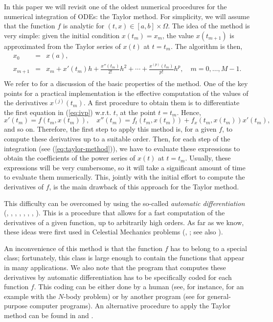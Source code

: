 \documentclass[12pt,twoside]{article}
\begin{document}
In this paper we will revisit one of the oldest numerical procedures
for the numerical integration of ODEs: the Taylor method. For
simplicity, we will assume that the function $f$ is analytic for
$(t,x)\in[a,b]\times\Omega$. The idea of the method is very simple:
given the initial condition $x(t_m)=x_m$, the value $x(t_{m+1})$ is
approximated from the Taylor series of $x(t)$ at $t=t_m$. The
algorithm is then,
\begin{equation}
\begin{array}{rcl}
x_0 &=&x(a), \\
x_{m+1} &=& x_m+x'(t_m)h+\displaystyle\frac{x''(t_m)}{2!}h^2+\cdots+
   \displaystyle\frac{x^{(p)}(t_m)}{p!}h^p,
      \quad m=0,\ldots, M-1. \\
\end{array}
\label{eq:taylor-method}
\end{equation}
We refer to \cite{HairerNW00} for a discussion of the basic properties
of the method. One of the key points for a practical implementation is
the effective computation of the values of the derivatives
$x^{(j)}(t_m)$. A first procedure to obtain them is to differentiate
the first equation in (\ref{eq:ivp}) w.r.t. $t$, at the point
$t=t_m$. Hence,
\[
x'(t_m)=f(t_m,x(t_m)),\quad
x''(t_m)=f_t(t_m,x(t_m))+f_x(t_m,x(t_m))x'(t_m),
\]
and so on. Therefore, the first step to apply this method is, for a
given $f$, to compute these derivatives up to a suitable order. Then,
for each step of the integration (see (\ref{eq:taylor-method})), we
have to evaluate these expressions to obtain the coefficients of the
power series of $x(t)$ at $t=t_m$. Usually, these expressions will be
very cumbersome, so it will take a significant amount of time to
evaluate them numerically. This, jointly with the initial effort to
compute the derivatives of $f$, is the main drawback of this approach
for the Taylor method.

This difficulty can be overcomed by using the so-called {\em automatic
differentiation} (\cite{Beda59}, \cite{Weng64}, \cite{Moore66},
\cite{Rall81}, \cite{GriewankC91}, \cite{BischofCCG92},
\cite{BerzBCG96}, \cite{Griewank00}).  This is a procedure that allows
for a fast computation of the derivatives of a given function, up to
arbitrarily high orders. As far as we know, these ideas were first
used in Celestial Mechanics problems (\cite{Steffensen56},
\cite{Steffensen57}; see also \cite{Broucke71}).

An inconvenience of this method is that the function $f$ has to belong
to a special class; fortunately, this class is large enough to contain
the functions that appear in many applications. We also note that the
program that computes these derivatives by automatic differentiation
has to be specifically coded for each function $f$. This coding can be
either done by a human (see, for instance, \cite{Broucke71} for an
example with the $N$-body problem) or by another program (see
\cite{Beda59,Gibbons60a,ChangC94} for general-purpose computer
programs). An alternative procedure to apply the Taylor method can be
found in \cite{SavageauV87} and \cite{IrvineS90}.
\end{document}
